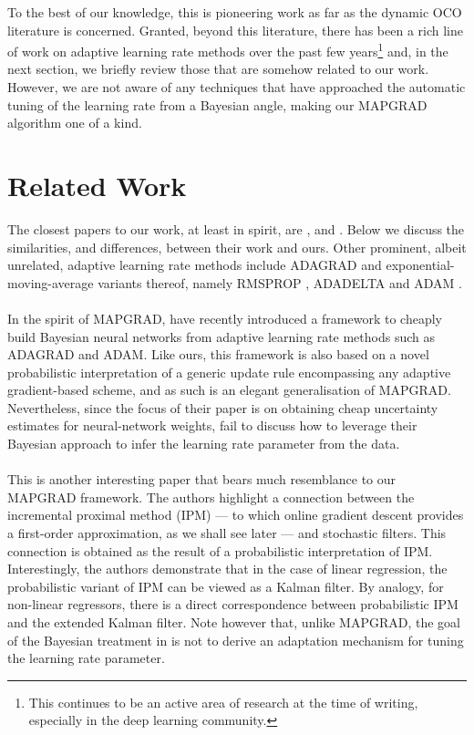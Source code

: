 To the best of our knowledge, this is pioneering work as far as the dynamic OCO literature is concerned. Granted, beyond this literature, there has been a rich line of work on adaptive learning rate methods over the past few years\footnote{This continues to be an active area of research at the time of writing, especially in the deep learning community.} and, in the next section, we briefly review those that are somehow related to our work. However, we are not aware of any techniques that have approached the automatic tuning of the learning rate from a Bayesian angle, making our MAPGRAD algorithm one of a kind.


\section{Related Work}
\label{sec:related-work}

The closest papers to our work, at least in spirit, are \citep{badam}, \citep{probabilistic-ipm} and \citep{blondel14}. Below we discuss the similarities, and differences, between their work and ours. Other prominent, albeit unrelated, adaptive learning rate methods include ADAGRAD \citep{adagrad} and exponential-moving-average variants thereof, namely RMSPROP \citep{rmsprop}, ADADELTA \citep{adadelta} and ADAM \citep{adam}.

\paragraph{\citep{badam}}

In the spirit of MAPGRAD, \citet{badam} have recently introduced a framework to cheaply build Bayesian neural networks from adaptive learning rate methods such as ADAGRAD and ADAM. Like ours, this framework is also based on a novel probabilistic interpretation of a generic update rule encompassing any adaptive gradient-based scheme, and as such is an elegant generalisation of MAPGRAD. Nevertheless, since the focus of their paper is on obtaining cheap uncertainty estimates for neural-network weights, \citet{badam} fail to discuss how to leverage their Bayesian approach to infer the learning rate parameter from the data.

\paragraph{\citep{probabilistic-ipm}}

This is another interesting paper that bears much resemblance to our MAPGRAD framework. The authors highlight a connection between the incremental proximal method (IPM) --- to which online gradient descent provides a first-order approximation, as we shall see later --- and stochastic filters. This connection is obtained as the result of a probabilistic interpretation of IPM. Interestingly, the authors demonstrate that in the case of linear regression, the probabilistic variant of IPM can be viewed as a Kalman filter. By analogy, for non-linear regressors, there is a direct correspondence between probabilistic IPM and the extended Kalman filter. Note however that, unlike MAPGRAD, the goal of the Bayesian treatment in \citep{probabilistic-ipm} is not to derive an adaptation mechanism for tuning the learning rate parameter. 

